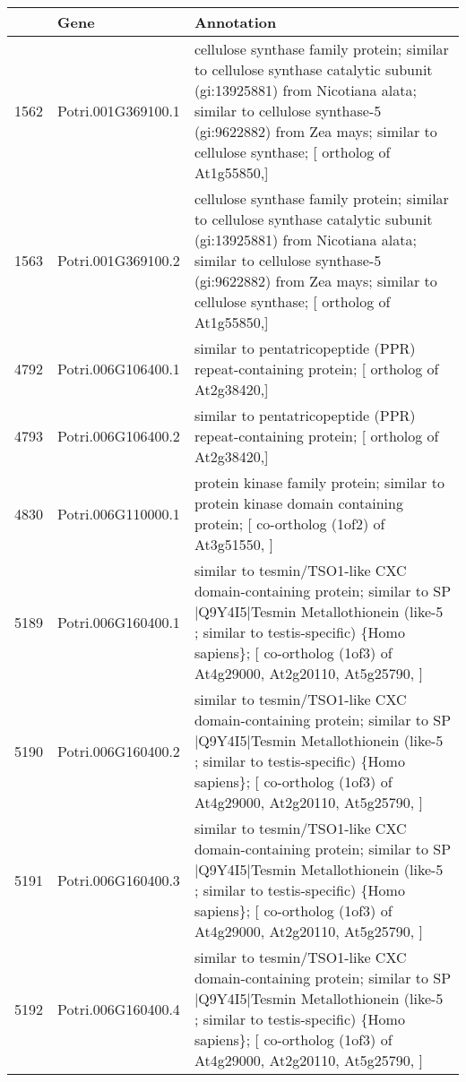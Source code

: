 \begin{table}[ht]
\centering
\begin{tabular}{rll}
  \hline
 & Gene & Annotation \\ 
  \hline
1562 & Potri.001G369100.1 & cellulose synthase family protein; similar to cellulose synthase catalytic subunit (gi:13925881) from Nicotiana alata; similar to cellulose synthase-5 (gi:9622882) from Zea mays; similar to cellulose synthase; [ ortholog of At1g55850,] \\ 
  1563 & Potri.001G369100.2 & cellulose synthase family protein; similar to cellulose synthase catalytic subunit (gi:13925881) from Nicotiana alata; similar to cellulose synthase-5 (gi:9622882) from Zea mays; similar to cellulose synthase; [ ortholog of At1g55850,] \\ 
  4792 & Potri.006G106400.1 & similar to pentatricopeptide (PPR) repeat-containing protein; [ ortholog of At2g38420,] \\ 
  4793 & Potri.006G106400.2 & similar to pentatricopeptide (PPR) repeat-containing protein; [ ortholog of At2g38420,] \\ 
  4830 & Potri.006G110000.1 & protein kinase family protein; similar to protein kinase domain containing protein; [ co-ortholog (1of2) of At3g51550, ] \\ 
  5189 & Potri.006G160400.1 & similar to tesmin/TSO1-like CXC domain-containing protein; similar to SP$|$Q9Y4I5$|$Tesmin Metallothionein (like-5 ; similar to testis-specific) \{Homo sapiens\}; [ co-ortholog (1of3) of At4g29000, At2g20110, At5g25790, ] \\ 
  5190 & Potri.006G160400.2 & similar to tesmin/TSO1-like CXC domain-containing protein; similar to SP$|$Q9Y4I5$|$Tesmin Metallothionein (like-5 ; similar to testis-specific) \{Homo sapiens\}; [ co-ortholog (1of3) of At4g29000, At2g20110, At5g25790, ] \\ 
  5191 & Potri.006G160400.3 & similar to tesmin/TSO1-like CXC domain-containing protein; similar to SP$|$Q9Y4I5$|$Tesmin Metallothionein (like-5 ; similar to testis-specific) \{Homo sapiens\}; [ co-ortholog (1of3) of At4g29000, At2g20110, At5g25790, ] \\ 
  5192 & Potri.006G160400.4 & similar to tesmin/TSO1-like CXC domain-containing protein; similar to SP$|$Q9Y4I5$|$Tesmin Metallothionein (like-5 ; similar to testis-specific) \{Homo sapiens\}; [ co-ortholog (1of3) of At4g29000, At2g20110, At5g25790, ] \\ 

\end{tabular}
\end{table}
